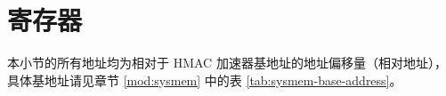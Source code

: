 \documentclass[main\_\_CN.tex]{subfiles}
\begin{document}





\clearpage
\section{寄存器}

本小节的所有地址均为相对于 HMAC 加速器基地址的地址偏移量（相对地址），具体基地址请见章节 \ref{mod:sysmem} \textit{} 中的表 \ref{tab:sysmem-base-address}。


\end{document}

